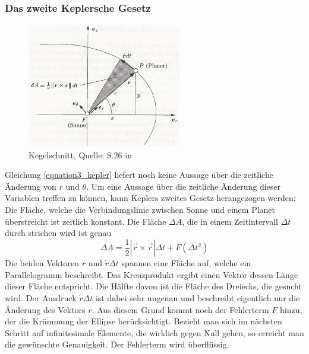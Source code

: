 \subsubsection{Das zweite Keplersche Gesetz}
\begin{figure}[h]                                                                           %
	\centering                                                                            	%
	\includegraphics[width=0.6\textwidth]{./images/keplers_law2.jpg}                        %
	\caption[Kegelschnitt]{Kegelschnitt, Quelle: S.26 in \cite{Raumflugm}}                  %
	\label{fig:kegelsch}                                                                    %
\end{figure}                                                                              	%
Gleichung \ref{equation3_kepler} liefert noch keine Aussage über die zeitliche Änderung von \ensuremath{r} und \ensuremath{\theta}. Um eine Aussage über die zeitliche Änderung dieser Variablen treffen zu können, kann Keplers zweites Gesetz herangezogen werden: Die Fläche, welche die Verbindungslinie zwischen Sonne und einem Planet überstreicht ist zeitlich konstant. Die Fläche \ensuremath{\Delta A}, die in einem Zeitintervall \ensuremath{\Delta t} durch strichen wird ist genau
\begin{equation}
	\Delta A = \frac{1}{2}\left| \vec{r} \times \dot{\vec{r}} \right|\Delta t + F(\Delta t^2)
\end{equation}   
Die beiden Vektoren \ensuremath{r} und \ensuremath{\dot{r} \Delta t} spannen eine Fläche auf, welche ein Parallelogramm beschreibt. Das Kreuzprodukt ergibt einen Vektor dessen Länge dieser Fläche entspricht. Die Hälfte davon ist die Fläche des Dreiecks, die gesucht wird. Der Ausdruck \ensuremath{\dot{r} \Delta t} ist dabei sehr ungenau und beschreibt eigentlich nur die Änderung des Vektors \ensuremath{r}. Aus diesem Grund kommt noch der Fehlerterm \ensuremath{F} hinzu, der die Krümmung der Ellipse berücksichtigt. Bezieht man sich im nächsten Schritt auf infinitesimale Elemente, die wirklich gegen Null gehen, so erreicht man die gewünschte Genauigkeit. Der Fehlerterm wird überflüssig.  

